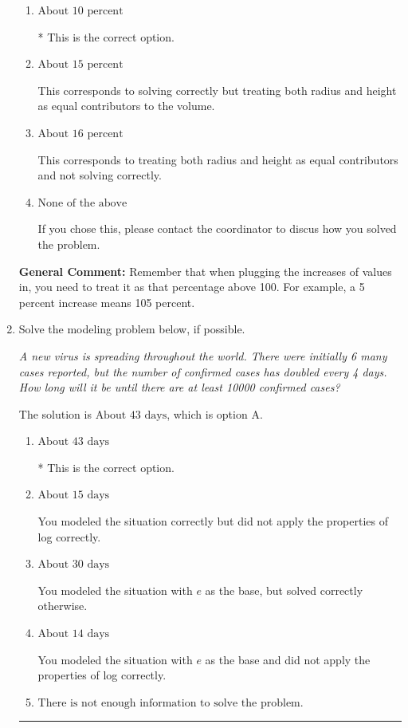 \documentclass{extbook}[14pt]
\newcommand{\litem}[1]{\item #1

\rule{\textwidth}{0.4pt}}
\begin{document}
\begin{enumerate}
{\begin{enumerate}[label=\Alph*.]
This corresponds to not solving for the increase properly.
\item \( \text{About } 10 \text{ percent} \)

* This is the correct option.
\item \( \text{About } 15 \text{ percent} \)

This corresponds to solving correctly but treating both radius and height as equal contributors to the volume.
\item \( \text{About } 16 \text{ percent} \)

This corresponds to treating both radius and height as equal contributors and not solving correctly.
\item \( \text{None of the above} \)

If you chose this, please contact the coordinator to discus how you solved the problem.
\end{enumerate}

\textbf{General Comment:} Remember that when plugging the increases of values in, you need to treat it as that percentage above 100. For example, a 5 percent increase means 105 percent.
}
\litem{
Solve the modeling problem below, if possible.

\begin{center}
    \textit{ A new virus is spreading throughout the world. There were initially 6 many cases reported, but the number of confirmed cases has doubled every 4 days. How long will it be until there are at least 10000 confirmed cases? }
\end{center}
The solution is \( \text{About } 43 \text{ days} \), which is option A.\begin{enumerate}[label=\Alph*.]
\item \( \text{About } 43 \text{ days} \)

* This is the correct option.
\item \( \text{About } 15 \text{ days} \)

You modeled the situation correctly but did not apply the properties of log correctly.
\item \( \text{About } 30 \text{ days} \)

You modeled the situation with $e$ as the base, but solved correctly otherwise.
\item \( \text{About } 14 \text{ days} \)

You modeled the situation with $e$ as the base and did not apply the properties of log correctly.
\item \( \text{There is not enough information to solve the problem.} \)


\end{enumerate}}
\end{enumerate}
\end{document}
